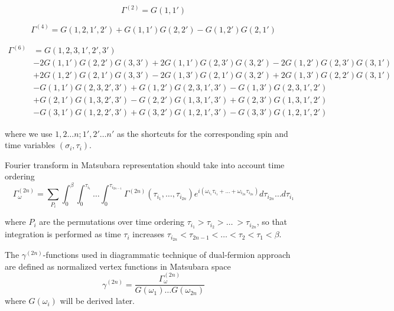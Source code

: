 \begin{equation} \Gamma^{(2)} = G(1, 1') \end{equation}

\begin{equation} \Gamma^{(4)} = G(1,2,1',2')+G(1,1')G(2,2')-G(1,2')G(2,1')\end{equation}

\begin{equation}\begin{aligned}
\Gamma^{(6)} & = G(1, 2, 3, 1', 2', 3') \\
& -2 G(1, 1') G(2, 2') G(3, 3') 
+2 G(1, 1') G(2, 3') G(3, 2')
-2 G(1, 2') G(2, 3') G(3, 1') \\ 
& +2 G(1, 2') G(2, 1') G(3, 3')
-2 G(1, 3') G(2, 1') G(3, 2')
+2 G(1, 3') G(2, 2') G(3, 1') \\
& -G(1, 1') G(2, 3, 2', 3')
+G(1, 2') G(2, 3, 1', 3')
-G(1, 3') G(2, 3, 1', 2') \\
& +G(2, 1') G(1, 3, 2', 3')
-G(2, 2') G(1, 3, 1', 3')
+G(2, 3') G(1, 3, 1', 2') \\
& -G(3, 1') G(1, 2, 2', 3')
+G(3, 2') G(1, 2, 1', 3')
-G(3, 3') G(1, 2, 1', 2')
\end{aligned}\end{equation}

where we use $1,2\dots n;1',2'\dots n'$ as the shortcuts for the corresponding spin and time variables $(\sigma_i,\tau_i)$.

Fourier transform in Matsubara representation should take into account time ordering
\begin{equation}
  \Gamma_\omega^{(2n)} = \sum_{P_i} \int_0^\beta\int_0^{\tau_{i_1}}\dots\int_0^{\tau_{i_{2n-1}}}\Gamma^{(2n)}(\tau_{i_1},\dots,\tau_{i_{2n}})
  e^{i(\omega_{i_1}\tau_{i_1}+\dots+\omega_{i_{2n}}\tau_{i_{2n}})}d\tau_{i_{2n}}\dots d\tau_{i_1}
\end{equation}

where $P_i$ are the permutations over time ordering $\tau_{i_1}>\tau_{i_2}>\dots\ >\tau_{i_{2n}}$,
 so that integration is performed as time $\tau_i$ increases $\tau_{i_{2n}}<\tau_{2n-1}<\dots<\tau_2<\tau_1<\beta$.

The $\gamma^{(2n)}$-functions used in diagrammatic technique of dual-fermion approach are defined as normalized vertex functions in Matsubara space
\begin{equation} \gamma^{(2n)} = \frac{\Gamma_\omega^{(2n)}}{G(\omega_1)\dots G(\omega_{2n})} \end{equation}
where $G(\omega_i)$ will be derived later.

